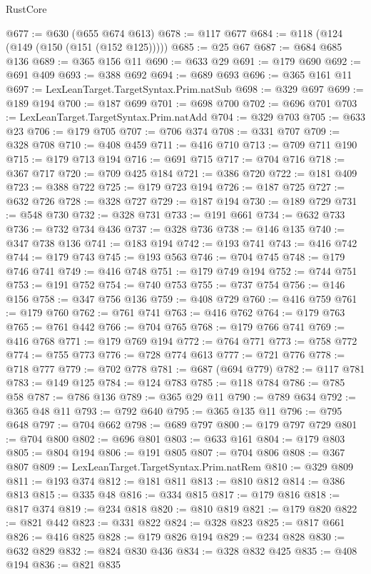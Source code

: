 \begin{lexlean}{RustCore}
\begin{coremodule}
@677 := @630 (@655 @674 @613)
@678 := @117 @677
@684 := @118 (@124 (@149 (@150 (@151 (@152 @125)))))
@685 := @25 @67
@687 := @684 @685 @136
@689 := @365 @156 @11
@690 := @633 @29
@691 := @179 @690
@692 := @691 @409
@693 := @388 @692
@694 := @689 @693
@696 := @365 @161 @11
@697 := LexLeanTarget.TargetSyntax.Prim.natSub
@698 := @329 @697
@699 := @189 @194
@700 := @187 @699
@701 := @698 @700
@702 := @696 @701
@703 := LexLeanTarget.TargetSyntax.Prim.natAdd
@704 := @329 @703
@705 := @633 @23
@706 := @179 @705
@707 := @706 @374
@708 := @331 @707
@709 := @328 @708
@710 := @408 @459
@711 := @416 @710
@713 := @709 @711 @190
@715 := @179 @713 @194
@716 := @691 @715
@717 := @704 @716
@718 := @367 @717
@720 := @709 @425 @184
@721 := @386 @720
@722 := @181 @409
@723 := @388 @722
@725 := @179 @723 @194
@726 := @187 @725
@727 := @632 @726
@728 := @328 @727
@729 := @187 @194
@730 := @189 @729
@731 := @548 @730
@732 := @328 @731
@733 := @191 @661
@734 := @632 @733
@736 := @732 @734 @436
@737 := @328 @736
@738 := @146 @135
@740 := @347 @738 @136
@741 := @183 @194
@742 := @193 @741
@743 := @416 @742
@744 := @179 @743
@745 := @193 @563
@746 := @704 @745
@748 := @179 @746 @741
@749 := @416 @748
@751 := @179 @749 @194
@752 := @744 @751
@753 := @191 @752
@754 := @740 @753
@755 := @737 @754
@756 := @146 @156
@758 := @347 @756 @136
@759 := @408 @729
@760 := @416 @759
@761 := @179 @760
@762 := @761 @741
@763 := @416 @762
@764 := @179 @763
@765 := @761 @442
@766 := @704 @765
@768 := @179 @766 @741
@769 := @416 @768
@771 := @179 @769 @194
@772 := @764 @771
@773 := @758 @772
@774 := @755 @773
@776 := @728 @774 @613
@777 := @721 @776
@778 := @718 @777
@779 := @702 @778
@781 := @687 (@694 @779)
@782 := @117 @781
@783 := @149 @125
@784 := @124 @783
@785 := @118 @784
@786 := @785 @58
@787 := @786 @136
@789 := @365 @29 @11
@790 := @789 @634
@792 := @365 @48 @11
@793 := @792 @640
@795 := @365 @135 @11
@796 := @795 @648
@797 := @704 @662
@798 := @689 @797
@800 := @179 @797 @729
@801 := @704 @800
@802 := @696 @801
@803 := @633 @161
@804 := @179 @803
@805 := @804 @194
@806 := @191 @805
@807 := @704 @806
@808 := @367 @807
@809 := LexLeanTarget.TargetSyntax.Prim.natRem
@810 := @329 @809
@811 := @193 @374
@812 := @181 @811
@813 := @810 @812
@814 := @386 @813
@815 := @335 @48
@816 := @334 @815
@817 := @179 @816
@818 := @817 @374
@819 := @234 @818
@820 := @810 @819
@821 := @179 @820
@822 := @821 @442
@823 := @331 @822
@824 := @328 @823
@825 := @817 @661
@826 := @416 @825
@828 := @179 @826 @194
@829 := @234 @828
@830 := @632 @829
@832 := @824 @830 @436
@834 := @328 @832 @425
@835 := @408 @194
@836 := @821 @835

\end{coremodule}
\end{lexlean}
